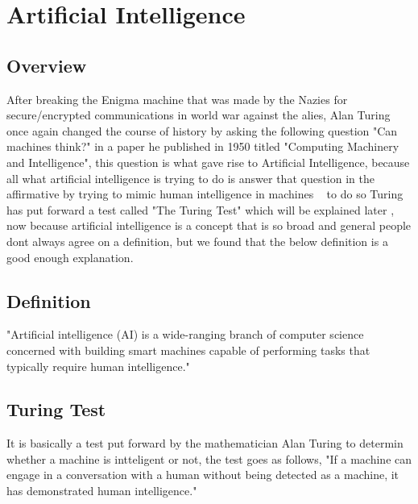 \section{Artificial Intelligence}
\subsection{Overview} 
        After breaking the Enigma machine that was made by the Nazies for secure/encrypted communications in world war against the alies, Alan Turing once again changed the course of history by asking the following question "Can machines think?" in a paper he published in 1950 titled "Computing Machinery and Intelligence", this question is what gave rise to Artificial Intelligence, because all what artificial intelligence is trying to do is answer that question in the affirmative by trying to mimic human intelligence in machines ~\cite{ai} to do so Turing has put forward a test called "The Turing Test" which will be explained later , now because artificial intelligence is a concept that is  so broad and general people dont always agree on a definition, but we found that the below definition is a good enough explanation.
        
    \subsection{Definition}
        "Artificial intelligence (AI) is a wide-ranging branch of computer science concerned with building smart machines capable of performing tasks that typically require human intelligence." ~\cite{ai}

    \subsection{Turing Test}
        It is basically a test put forward by the mathematician Alan Turing to determin whether a machine is intteligent or not, the test goes as follows, "If a machine can engage in a conversation with a human without being detected as a machine, it has demonstrated human intelligence." ~\cite{turing}
    
